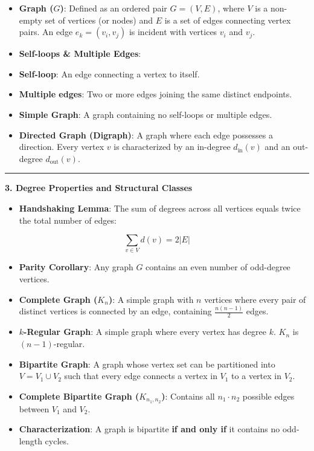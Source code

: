 \documentclass[
]{book}
\providecommand{\tightlist}{%
  \setlength{\itemsep}{0pt}\setlength{\parskip}{0pt}}
\theoremstyle{definition}
\theoremstyle{definition}
\theoremstyle{definition}
\theoremstyle{definition}
\theoremstyle{remark}
\begin{document}
\begin{itemize}
\item
  \textbf{Graph (\(G\))}: Defined as an ordered pair \(G = (V, E)\), where \(V\) is a non-empty set of vertices (or nodes) and \(E\) is a set of edges connecting vertex pairs. An edge \(e_k = (v_i, v_j)\) is incident with vertices \(v_i\) and \(v_j\).
\item
  \textbf{Self-loops \& Multiple Edges}:
\item
  \textbf{Self-loop}: An edge connecting a vertex to itself.
\item
  \textbf{Multiple edges}: Two or more edges joining the same distinct endpoints.
\item
  \textbf{Simple Graph}: A graph containing no self-loops or multiple edges.
\item
  \textbf{Directed Graph (Digraph)}: A graph where each edge possesses a direction. Every vertex \(v\) is characterized by an in-degree \(d_{\text{in}}(v)\) and an out-degree \(d_{\text{out}}(v)\).
\end{itemize}

\begin{center}\rule{0.5\linewidth}{0.5pt}\end{center}

\textbf{3. Degree Properties and Structural Classes}

\begin{itemize}
\tightlist
\item
  \textbf{Handshaking Lemma}: The sum of degrees across all vertices equals twice the total number of edges:
\end{itemize}

\[\sum_{v \in V} d(v) = 2\vert{}E\vert{}\]

\begin{itemize}
\tightlist
\item
  \textbf{Parity Corollary}: Any graph \(G\) contains an even number of odd-degree vertices.
\item
  \textbf{Complete Graph (\(K_n\))}: A simple graph with \(n\) vertices where every pair of distinct vertices is connected by an edge, containing \(\frac{n(n-1)}{2}\) edges.
\item
  \textbf{\(k\)-Regular Graph}: A simple graph where every vertex has degree \(k\). \(K_n\) is \((n-1)\)-regular.
\item
  \textbf{Bipartite Graph}: A graph whose vertex set can be partitioned into \(V = V_1 \cup V_2\) such that every edge connects a vertex in \(V_1\) to a vertex in \(V_2\).
\item
  \textbf{Complete Bipartite Graph (\(K_{n_1, n_2}\))}: Contains all \(n_1 \cdot n_2\) possible edges between \(V_1\) and \(V_2\).
\item
  \textbf{Characterization}: A graph is bipartite \textbf{if and only if} it contains no odd-length cycles.
\end{itemize}
\end{document}

